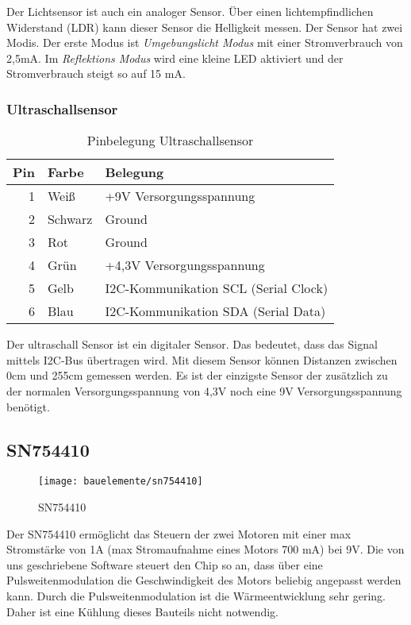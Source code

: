 Der Lichtsensor ist auch ein analoger Sensor. Über einen lichtempfindlichen Widerstand (LDR) kann dieser Sensor die Helligkeit messen. Der Sensor hat zwei Modis. Der erste Modus ist \emph{Umgebungslicht Modus} mit einer Stromverbrauch von 2,5mA.  Im \emph{Reflektions Modus} wird eine kleine LED aktiviert und der Stromverbrauch steigt so auf 15 mA.

\subsubsection{Ultraschallsensor}
\begin{table}[!ht]
\centering
\rmfamily
\caption{Pinbelegung Ultraschallsensor}
\renewcommand{\arraystretch}{1.1}
\sffamily
\begin{footnotesize}
\begin{tabular}{r | l l}
\toprule
\textbf{Pin} & \textbf{Farbe}  & \textbf{Belegung}\\
\midrule
1 & Weiß & +9V Versorgungsspannung \\
2 & Schwarz & Ground \\
3 & Rot & Ground \\
4 & Grün & +4,3V Versorgungsspannung \\
5 & Gelb & I2C-Kommunikation SCL (Serial Clock) \\
6 & Blau & I2C-Kommunikation SDA (Serial Data) \\
\bottomrule
\end{tabular}
\end{footnotesize}
\label{eb:ultraschall:tbl}
\end{table}

Der ultraschall Sensor ist ein digitaler Sensor. Das bedeutet, dass das Signal mittels I2C-Bus übertragen wird. Mit diesem Sensor können Distanzen zwischen  0cm und 255cm gemessen werden. Es ist der einzigste Sensor der zusätzlich zu der normalen Versorgungsspannung von 4,3V noch eine 9V Versorgungsspannung benötigt.

\subsection{SN754410}\label{eb:pwm}
\begin{wrapfigure}{r}{0.65\textwidth}
\texttt{[image: bauelemente/sn754410]}
\caption{SN754410}
\label{eb:fig:sn754410}
\end{wrapfigure}
Der SN754410 ermöglicht das Steuern der zwei Motoren mit einer max Stromstärke von 1A (max Stromaufnahme eines Motors 700 mA) bei 9V. Die von uns  geschriebene Software steuert den Chip so an, dass über eine Pulsweitenmodulation die Geschwindigkeit des Motors beliebig angepasst werden kann. Durch die Pulsweitenmodulation ist die Wärmeentwicklung sehr gering. Daher ist eine Kühlung dieses Bauteils nicht notwendig.

